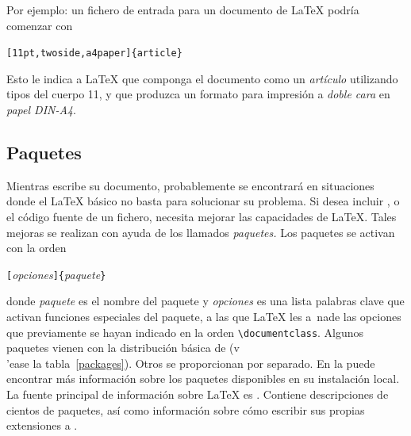 Por ejemplo: un fichero de entrada para un documento de \LaTeX{}
podr\'ia comenzar con
\begin{code}
\verb|[11pt,twoside,a4paper]{article}|
\end{code}
Esto le indica a \LaTeX{} que componga el documento como un
\emph{art\'iculo} utilizando tipos del cuerpo 11, y que produzca un
formato para impresi\'on a \emph{doble cara} en \emph{papel
DIN-A4}.

\pagebreak[2]
\subsection{Paquetes}
 Mientras escribe su documento, probablemente se
encontrar\'a en situaciones donde el \LaTeX{} b\'asico no basta para
solucionar su problema. Si desea incluir ,  o el c\'odigo fuente de un fichero, necesita mejorar las
capacidades de \LaTeX. Tales mejoras se realizan con ayuda de los
llamados \emph{paquetes.} Los paquetes se activan con la orden
\begin{command}
\verb|[|\emph{opciones}\verb|]{|\emph{paquete}\verb|}|
\end{command}
\noindent donde \emph{paquete} es el nombre del paquete y
\emph{opciones} es una lista palabras clave que activan funciones
especiales del paquete, a las que \LaTeX{} les a~nade las opciones
que previamente se hayan indicado en la orden
\verb|\documentclass|. Algunos paquetes vienen con la
distribuci\'on b\'asica de \LaTeXe{} (v\\'ease la
tabla~\ref{packages}). Otros se proporcionan por separado. En la
\guia{} puede encontrar m\'as informaci\'on sobre los paquetes
disponibles en su instalaci\'on local. La fuente principal de
informaci\'on sobre \LaTeX{} es \companion. Contiene descripciones
de cientos de paquetes, as\'i como informaci\'on sobre c\'omo
escribir sus propias extensiones a \LaTeXe.


